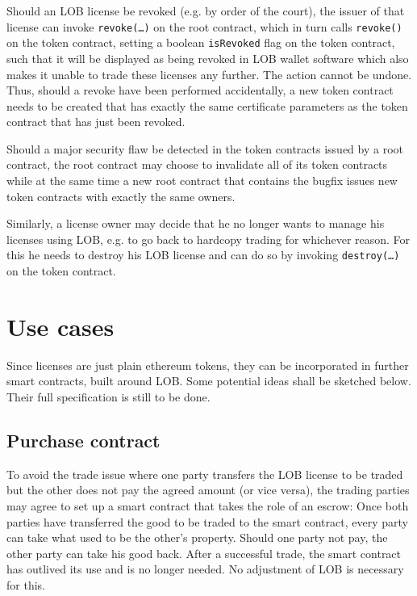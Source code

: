 \documentclass[a4paper]{article}
\begin{document}
Should an LOB license be revoked (e.g. by order of the court), the issuer of that license can invoke \texttt{revoke(…)} on the root contract, which in turn calls \texttt{revoke()} on the token contract, setting a boolean \texttt{isRevoked} flag on the token contract, such that it will be displayed as being revoked in LOB wallet software which also makes it unable to trade these licenses any further. The action cannot be undone. Thus, should a revoke have been performed accidentally, a new token contract needs to be created that has exactly the same certificate parameters as the token contract that has just been revoked.

Should a major security flaw be detected in the token contracts issued by a root contract, the root contract may choose to invalidate all of its token contracts while at the same time a new root contract that contains the bugfix issues new token contracts with exactly the same owners.

Similarly, a license owner may decide that he no longer wants to manage his licenses using LOB, e.g. to go back to hardcopy trading for whichever reason. For this he needs to destroy his LOB license and can do so by invoking \texttt{destroy(…)} on the token contract.

\section{Use cases}

Since licenses are just plain ethereum tokens, they can be incorporated in further smart contracts, built around LOB. Some potential ideas shall be sketched below. Their full specification is still to be done.

\subsection{Purchase contract}

To avoid the trade issue where one party transfers the LOB license to be traded but the other does not pay the agreed amount (or vice versa), the trading parties may agree to set up a smart contract that takes the role of an escrow: Once both parties have transferred the good to be traded to the smart contract, every party can take what used to be the other's property. Should one party not pay, the other party can take his good back. After a successful trade, the smart contract has outlived its use and is no longer needed. No adjustment of LOB is necessary for this.
\end{document}
